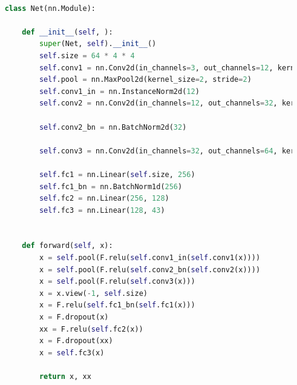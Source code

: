 \documentclass[twoside, 12pt,a4paper]{article}
\numberwithin{equation}{section}
\begin{document}
	\begin{lstlisting}[language=Python, caption=Kleines Netzwerk]
	
	class Net(nn.Module):
	
		def __init__(self, ):
			super(Net, self).__init__()
			self.size = 64 * 4 * 4
			self.conv1 = nn.Conv2d(in_channels=3, out_channels=12, kernel_size=5, padding=2)
			self.pool = nn.MaxPool2d(kernel_size=2, stride=2)
			self.conv1_in = nn.InstanceNorm2d(12)
			self.conv2 = nn.Conv2d(in_channels=12, out_channels=32, kernel_size=5, padding=2)
			
			self.conv2_bn = nn.BatchNorm2d(32)
			
			self.conv3 = nn.Conv2d(in_channels=32, out_channels=64, kernel_size=5, padding=2)
			
			self.fc1 = nn.Linear(self.size, 256)
			self.fc1_bn = nn.BatchNorm1d(256)
			self.fc2 = nn.Linear(256, 128)
			self.fc3 = nn.Linear(128, 43)
		
	
		def forward(self, x):
			x = self.pool(F.relu(self.conv1_in(self.conv1(x))))
			x = self.pool(F.relu(self.conv2_bn(self.conv2(x))))
			x = self.pool(F.relu(self.conv3(x)))
			x = x.view(-1, self.size)
			x = F.relu(self.fc1_bn(self.fc1(x)))
			x = F.dropout(x)
			xx = F.relu(self.fc2(x))
			x = F.dropout(xx)
			x = self.fc3(x)
			
			return x, xx
	
	\end{lstlisting}
	
\end{document}
